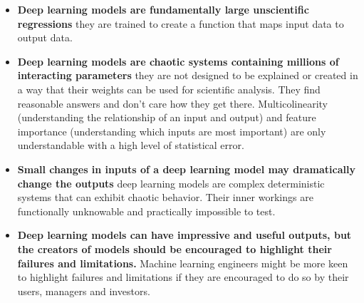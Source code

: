 \begin{itemize}
    \item \textbf{Deep learning models are fundamentally large unscientific regressions} they are trained to create a function that maps input data to output data.
    \item \textbf{Deep learning models are chaotic systems containing millions of interacting parameters} they are not designed to be explained or created in a way that their weights can be used for scientific analysis. They find reasonable answers and don't care how they get there. Multicolinearity (understanding the relationship of an input and output) and feature importance (understanding which inputs are most important) are only understandable with a high level of statistical error.
    \item \textbf{Small changes in inputs of a deep learning model may dramatically change the outputs} deep learning models are complex deterministic systems that can exhibit chaotic behavior. Their inner workings are functionally unknowable and practically impossible to test.
    \item \textbf{Deep learning models can have impressive and useful outputs, but the creators of models should be encouraged to highlight their failures and limitations.} Machine learning engineers might be more keen to highlight failures and limitations if they are encouraged to do so by their users, managers and investors.
\end{itemize}

